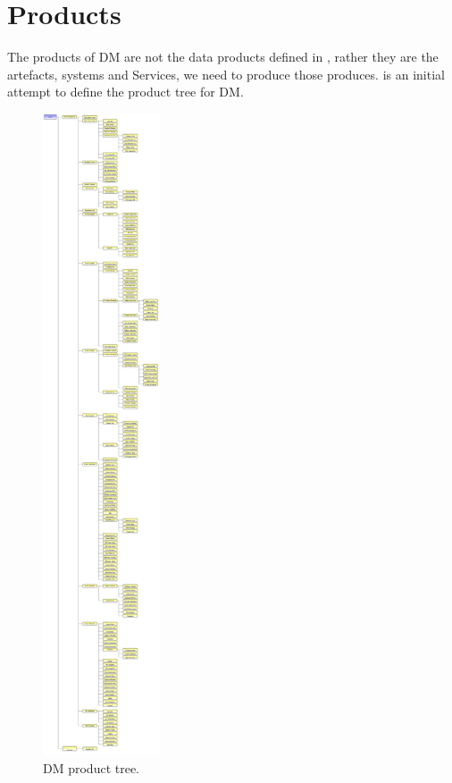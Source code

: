 \section {Products} \label{sect:products}

The products of DM are not the data products defined in , rather they are the artefacts, systems and Services,  we need to produce those produces.  is an initial attempt to define the product tree for DM. 

\begin{figure}[htbp]
\begin{center}
 \includegraphics[height=19cm]{ProductTree}
\caption{DM product tree. \label{fig:prods}}
\end{center}
\end{figure}

